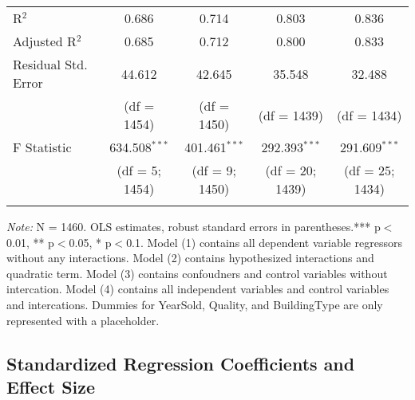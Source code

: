 \documentclass[a4paper]{article}
\begin{document}
\begin{table}[!htbp]
\begin{adjustwidth}{-0.0cm}{-0cm}
\begin{threeparttable}
\begin{tabular}{@{\extracolsep{1pt}}lcccc}
R$^{2}$ & 0.686 & 0.714 & 0.803 & 0.836 \\ 
Adjusted R$^{2}$ & 0.685 & 0.712 & 0.800 & 0.833 \\ 
Residual Std. Error & 44.612 & 42.645 & 35.548 & 32.488 \\ 
& (df = 1454) & (df = 1450) & (df = 1439) & (df = 1434)\\
F Statistic & 634.508$^{***}$  & 401.461$^{***}$  & 292.393$^{***}$  & 291.609$^{***}$  \\ 
 & (df = 5; 1454) & (df = 9; 1450) & (df = 20; 1439) & (df = 25; 1434) \\
\hline 
\hline \\[-3ex] 
\end{tabular} 
%
\begin{tablenotes}
      \small
      \item\textit{Note:} N = 1460. OLS estimates, robust standard errors in parentheses.*** p$<$0.01, ** p$<$0.05, * p$<$0.1. Model (1) contains all dependent variable regressors without any interactions. Model (2) contains hypothesized interactions and quadratic term. Model (3) contains confoudners and control variables without intercation. Model (4) contains all independent variables and control variables and intercations. Dummies for YearSold, Quality, and BuildingType are only represented with a placeholder.  
    \end{tablenotes}
\end{threeparttable}
\end{adjustwidth}
%
\end{table}




\subsection{Standardized Regression Coefficients and Effect Size}
\end{document}
